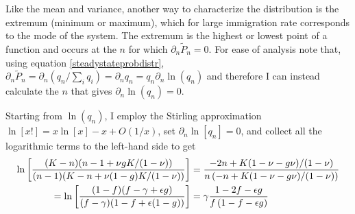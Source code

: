 Like the mean and variance, another way to characterize the distribution is the extremum (minimum or maximum), which for large immigration rate corresponds to the mode of the system. 
The extremum is the highest or lowest point of a function and occurs at the $n$ for which $\partial_n \widetilde{P}_n = 0$. 
For ease of analysis note that, using equation \ref{steadystateprobdistr}, $\partial_n \widetilde{P}_n = \partial_n \left( q_n/\sum_i q_i \right) = \partial_n q_n = q_n \partial_n \ln(q_n)$ and therefore I can instead calculate the $n$ that gives $\partial_n \ln(q_n)=0$. 
\iffalse
First,
\begin{align}
 \ln(q_n) &= 2\ln[K] - \ln\big[n(K-n)(1-\nu)+(1-g)n K\nu\big] + \ln[(K-n)!] + \ln\big[\left(n-1+\frac{\nu g K}{1-\nu}\right)!\big] \\
 		  &\, + \ln\big[\left(K-n+\frac{\nu (1-g) K}{1-\nu}\right)!\big] - \ln[(K-n)!] - \ln[(n-1)!] - \ln\big[\left(\frac{\nu g K}{1-\nu}\right)!\big] - \ln\big[\left(K-1+\frac{\nu (1-g) K}{1-\nu}\right)!\big] . \notag%
\end{align}
\fi
Starting from $\ln(q_n)$, I employ the Stirling approximation $\ln[x!] = x\ln[x] - x + O(1/x)$, set $\partial_n \ln[q_n]=0$, and collect all the logarithmic terms to the left-hand side to get
\iffalse
\begin{align}
 \ln\left[ \frac{(K-n)(n-1+\nu g K/(1-\nu))}{(n-1)(K-n+\nu(1-g)K/(1-\nu))}\right]  &= \frac{-2n+K(1-\nu-g\nu)/(1-\nu)}{n\left(-n+K(1-\nu-g\nu)/(1-\nu)\right)} \notag \\
=\ln\left[ \frac{(1-f)(f-\gamma+\epsilon g)}{(f-\gamma)(1-f+\epsilon(1-g))}\right] &= \gamma\frac{1-2f-\epsilon g}{f\left(1-f-\epsilon g\right)}
\end{align}
